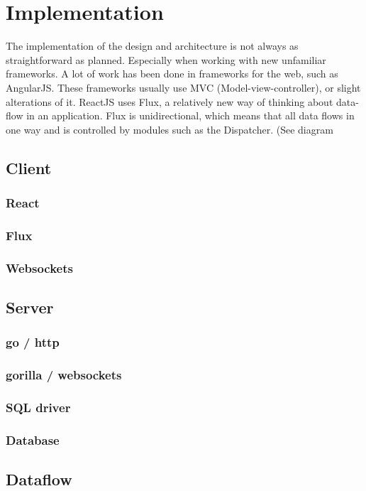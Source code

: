 \chapter{Implementation}

The implementation of the design and architecture is not always as straightforward as planned. Especially when working with new unfamiliar frameworks. A lot of work has been done in frameworks for the web, such as AngularJS. These frameworks usually use MVC (Model-view-controller), or slight alterations of it. ReactJS uses Flux, a relatively new way of thinking about data-flow in an application. Flux is unidirectional, which means that all data flows in one way and is controlled by modules such as the Dispatcher. (See diagram 
\section{Client}
\subsection{React}
\subsection{Flux}
\subsection{Websockets}

\section{Server}
\subsection{go / http}
\subsection{gorilla / websockets}
\subsection{SQL driver}
\subsection{Database}


\section{Dataflow}
